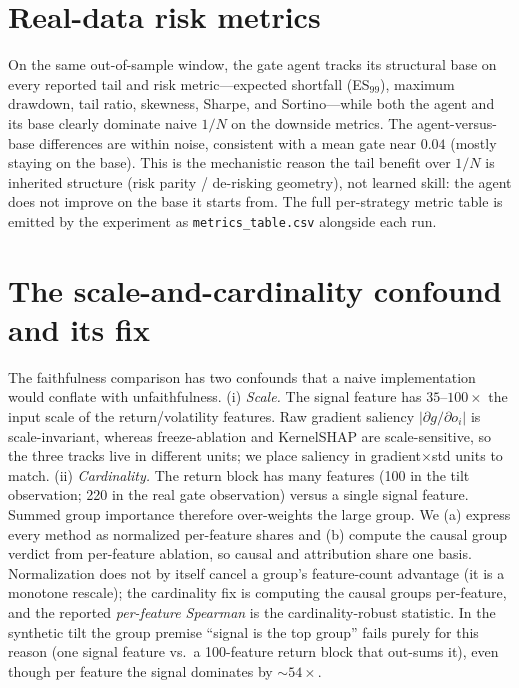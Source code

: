 \documentclass[sigconf,anonymous,review]{acmart}
\begin{document}
\section{Real-data risk metrics}\label{app:metrics}
On the same out-of-sample window, the gate agent tracks its structural base on every
reported tail and risk metric---expected shortfall (ES$_{99}$), maximum drawdown,
tail ratio, skewness, Sharpe, and Sortino---while both the agent and its base clearly
dominate naive $1/N$ on the downside metrics. The agent-versus-base differences are
within noise, consistent with a mean gate near $0.04$ (mostly staying on the base).
This is the mechanistic reason the tail benefit over $1/N$ is inherited structure
(risk parity / de-risking geometry), not learned skill: the agent does not improve on
the base it starts from. The full per-strategy metric table is emitted by the
experiment as \texttt{metrics\_table.csv} alongside each run.

\section{The scale-and-cardinality confound and its fix}\label{app:cardinality}
The faithfulness comparison has two confounds that a naive implementation would
conflate with unfaithfulness. (i) \emph{Scale.} The signal feature has $35$--$100\times$
the input scale of the return/volatility features. Raw gradient saliency
$\lvert\partial g/\partial o_i\rvert$ is scale-invariant, whereas freeze-ablation and
KernelSHAP are scale-sensitive, so the three tracks live in different units; we place
saliency in gradient$\times$std units to match. (ii) \emph{Cardinality.} The return
block has many features (100 in the tilt observation; 220 in the real gate
observation) versus a single signal feature. Summed group importance therefore
over-weights the large group. We (a) express every method as normalized per-feature
shares and (b) compute the causal group verdict from per-feature ablation, so causal
and attribution share one basis. Normalization does not by itself cancel a group's
feature-count advantage (it is a monotone rescale); the cardinality fix is computing
the causal groups per-feature, and the reported \emph{per-feature Spearman} is the
cardinality-robust statistic. In the synthetic tilt the group premise ``signal is the
top group'' fails purely for this reason (one signal feature vs.\ a 100-feature return
block that out-sums it), even though per feature the signal dominates by $\sim54\times$.
\end{document}
